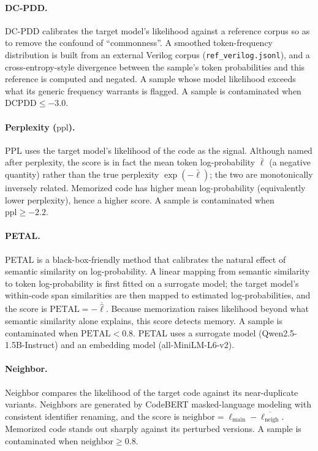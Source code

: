 \paragraph{DC-PDD.}
DC-PDD calibrates the target model's likelihood against a reference corpus so as to remove the confound of ``commonness''. A smoothed token-frequency distribution is built from an external Verilog corpus (\texttt{ref\_verilog.jsonl}), and a cross-entropy-style divergence between the sample's token probabilities and this reference is computed and negated. A sample whose model likelihood exceeds what its generic frequency warrants is flagged. A sample is contaminated when $\mathrm{DCPDD}\le -3.0$.

\paragraph{Perplexity ($\mathrm{ppl}$).}
PPL uses the target model's likelihood of the code as the signal. Although named after perplexity, the score is in fact the mean token log-probability $\bar\ell$ (a negative quantity) rather than the true perplexity $\exp(-\bar\ell)$; the two are monotonically inversely related. Memorized code has higher mean log-probability (equivalently lower perplexity), hence a higher score. A sample is contaminated when $\mathrm{ppl}\ge -2.2$.

\paragraph{PETAL.}
PETAL is a black-box-friendly method that calibrates the natural effect of semantic similarity on log-probability. A linear mapping from semantic similarity to token log-probability is first fitted on a surrogate model; the target model's within-code span similarities are then mapped to estimated log-probabilities, and the score is $\mathrm{PETAL}=-\overline{\hat\ell}$. Because memorization raises likelihood beyond what semantic similarity alone explains, this score detects memory. A sample is contaminated when $\mathrm{PETAL}<0.8$. PETAL uses a surrogate model (Qwen2.5-1.5B-Instruct) and an embedding model (all-MiniLM-L6-v2).

\paragraph{Neighbor.}
Neighbor compares the likelihood of the target code against its near-duplicate variants. Neighbors are generated by CodeBERT masked-language modeling with consistent identifier renaming, and the score is $\mathrm{neighbor}=\ell_{\mathrm{main}}-\overline{\ell_{\mathrm{neigh}}}$. Memorized code stands out sharply against its perturbed versions. A sample is contaminated when $\mathrm{neighbor}\ge 0.8$.

